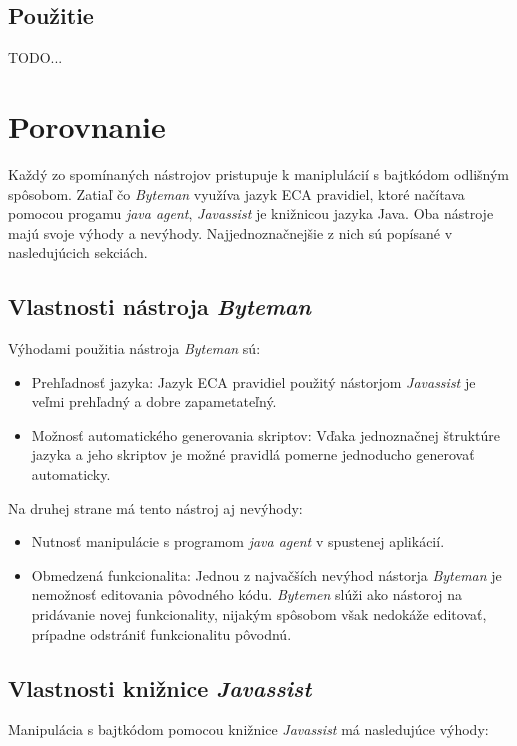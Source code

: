 \documentclass[11pt,final,oneside]{fithesis}
\begin{document}
\section{Použitie}
TODO...

\chapter{Porovnanie}
Každý zo spomínaných nástrojov pristupuje k maniplulácií s bajtkódom odlišným spôsobom. Zatiaľ čo \textit{Byteman} využíva jazyk ECA pravidiel, ktoré načítava pomocou progamu \textit{java agent}, \textit{Javassist} je knižnicou jazyka Java. Oba nástroje majú svoje výhody a nevýhody. Najjednoznačnejšie z nich sú popísané v nasledujúcich sekciách.

\section{Vlastnosti nástroja \textit{Byteman}}

Výhodami použitia nástroja \textit{Byteman} sú:

\begin{itemize}
\item Prehľadnosť jazyka: Jazyk ECA pravidiel použitý nástorjom \textit{Javassist} je veľmi prehľadný a dobre zapametateľný. 
\item Možnosť automatického generovania skriptov: Vďaka jednoznačnej štruktúre jazyka a jeho skriptov je možné pravidlá pomerne jednoducho generovať automaticky.
\end{itemize}

Na druhej strane má tento nástroj aj nevýhody:

\begin{itemize}
\item Nutnosť manipulácie s programom \textit{java agent} v spustenej aplikácií.
\item Obmedzená funkcionalita: Jednou z najvačších nevýhod nástorja \textit{Byteman} je nemožnosť editovania pôvodného kódu. \textit{Bytemen} slúži ako nástoroj na pridávanie novej funkcionality, nijakým spôsobom však nedokáže editovať, prípadne odstrániť funkcionalitu pôvodnú. 
\end{itemize}

\section{Vlastnosti knižnice \textit{Javassist}}

Manipulácia s bajtkódom pomocou knižnice \textit{Javassist} má nasledujúce výhody:
\end{document}
